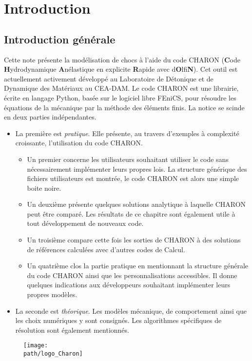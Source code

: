 \documentclass[10pt]{book}
\def\path{./fig}
\begin{document}
\setcounter{chapter}{-1}
\chapter{Introduction}\label{Chapitre:Introduction}
\section*{Introduction générale}
Cette note présente la modélisation de chocs à l'aide du code CHARON (\textbf{C}ode \textbf{H}ydrodynamique \textbf{A}nélastique en explicite \textbf{R}apide avec d\textbf{O}lfi\textbf{N}). Cet outil est actuellement activement développé au Laboratoire de Détonique et de Dynamique des Matériaux au CEA-DAM. Le code CHARON est une librairie, écrite en langage Python, basée sur le logiciel libre FEniCS, pour résoudre les équations de la mécanique par la méthode des éléments finis. La notice se scinde en deux parties indépendantes.
\begin{itemize}[label=$\star$]
\item La première  est \emph{pratique}. Elle présente, au travers d'exemples à complexité croissante, l'utilisation du code CHARON. 
\begin{itemize}
\item Un premier  concerne les utilisateurs souhaitant utiliser le code sans nécessairement implémenter leurs propres lois. La structure générique des fichiers utilisateurs est montrée, le code CHARON est alors une simple boite noire.
\item Un deuxième  présente quelques solutions analytique à laquelle CHARON peut être comparé. Les résultats de ce chapitre sont également utile à tout développement de nouveaux code.
\item Un troisième  compare cette fois les sorties de CHARON à des solutions de références calculées avec d'autres codes de Calcul.
\item Un quatrième  clos la partie pratique en mentionnant la structure générale du code CHARON ainsi que les personnalisations accessibles. Il donne quelques indications aux développeurs souhaitant implémenter leurs propres modèles.
\end{itemize}
\item La seconde  est \emph{théorique}. Les modèles mécanique, de comportement ainsi que les choix numériques y sont consignés. Les algorithmes spécifiques de résolution sont également mentionnés.
\end{itemize}
\begin{figure}[h!]
\centering \texttt{[image: \\path/logo\_Charon]}
\end{figure}
\clearpage
\end{document}

